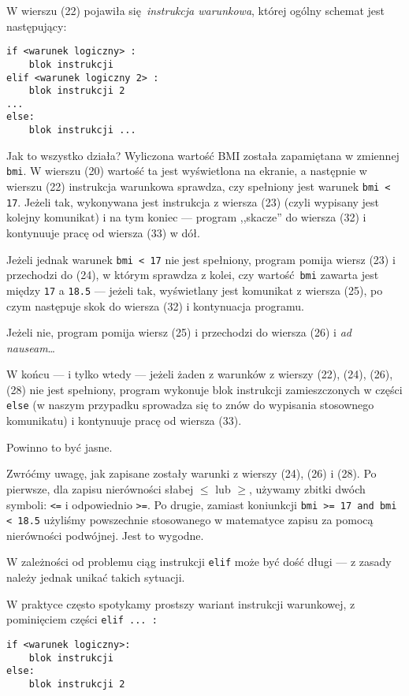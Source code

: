 \documentclass[a4paper]{article}
\begin{document}
W wierszu (22) pojawiła się \emph{instrukcja warunkowa}, której ogólny schemat jest następujący:

\lstset{numbers=none}
\begin{lstlisting}
if <warunek logiczny> :
    blok instrukcji
elif <warunek logiczny 2> :
    blok instrukcji 2
...
else:
    blok instrukcji ...
\end{lstlisting}

Jak to wszystko działa? Wyliczona wartość BMI została zapamiętana w zmiennej \texttt{bmi}. W wierszu (20) wartość ta jest wyświetlona na ekranie, a następnie w wierszu (22) instrukcja warunkowa sprawdza, czy spełniony jest warunek \lstinline|bmi < 17|. Jeżeli tak, wykonywana jest instrukcja z wiersza (23) (czyli wypisany jest kolejny komunikat) i na tym koniec --- program ,,skacze'' do wiersza (32) i kontynuuje pracę od wiersza (33) w dół.

Jeżeli jednak warunek \lstinline|bmi < 17| nie jest spełniony, program pomija wiersz (23) i przechodzi do (24), w którym sprawdza z kolei, czy wartość \texttt{bmi} zawarta jest między \texttt{17} a \texttt{18.5} --- jeżeli tak, wyświetlany jest komunikat z wiersza (25), po czym następuje skok do wiersza (32) i kontynuacja programu.

Jeżeli nie, program pomija wiersz (25) i przechodzi do wiersza (26) i \emph{ad nauseam}\ldots

W końcu --- i tylko wtedy --- jeżeli żaden z warunków z wierszy (22), (24), (26), (28) nie jest spełniony, program wykonuje blok instrukcji zamieszczonych w części \lstinline|else| (w naszym przypadku sprowadza się to znów do wypisania stosownego komunikatu) i kontynuuje pracę od wiersza (33).

Powinno to być jasne.

Zwróćmy uwagę, jak zapisane zostały warunki z wierszy (24), (26) i (28). Po pierwsze, dla zapisu nierówności słabej $\leqslant$ lub $\geqslant$, używamy zbitki dwóch symboli: \texttt{<=} i odpowiednio \texttt{>=}. Po drugie, zamiast koniunkcji  \lstinline|bmi >= 17 and bmi < 18.5| użyliśmy powszechnie stosowanego w matematyce zapisu za pomocą nierówności podwójnej. Jest to wygodne.

W zależności od problemu ciąg instrukcji \lstinline|elif| może być dość długi --- z zasady należy jednak unikać takich sytuacji.

W praktyce często spotykamy prostszy wariant instrukcji warunkowej, z pominięciem części \lstinline|elif ... :|

\lstset{numbers=none}
\begin{lstlisting}
if <warunek logiczny>:
    blok instrukcji
else:
    blok instrukcji 2
\end{lstlisting}
\end{document}
